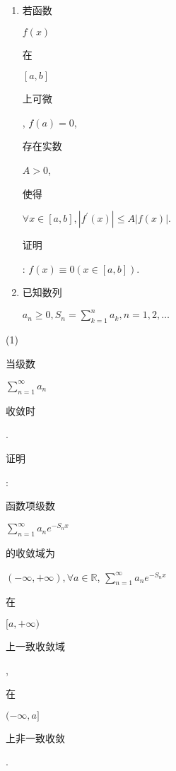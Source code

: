 \documentclass[10pt]{article}
\begin{document}
\begin{enumerate}
  \item \begin{CJK}{UTF8}{mj}若函数\end{CJK} $f(x)$ \begin{CJK}{UTF8}{mj}在\end{CJK} $[a, b]$ \begin{CJK}{UTF8}{mj}上可微\end{CJK}, $f(a)=0$, \begin{CJK}{UTF8}{mj}存在实数\end{CJK} $A>0$, \begin{CJK}{UTF8}{mj}使得\end{CJK} $\forall x \in[a, b],\left|f^{\prime}(x)\right| \leqslant A|f(x)|$. \begin{CJK}{UTF8}{mj}证明\end{CJK}: $f(x) \equiv 0(x \in[a, b])$.

  \item \begin{CJK}{UTF8}{mj}已知数列\end{CJK} $a_{n} \geqslant 0, S_{n}=\sum_{k=1}^{n} a_{k}, n=1,2, \ldots$

\end{enumerate}
(1) \begin{CJK}{UTF8}{mj}当级数\end{CJK} $\sum_{n=1}^{\infty} a_{n}$ \begin{CJK}{UTF8}{mj}收敛时\end{CJK}. \begin{CJK}{UTF8}{mj}证明\end{CJK}: \begin{CJK}{UTF8}{mj}函数项级数\end{CJK} $\sum_{n=1}^{\infty} a_{n} e^{-S_{n} x}$ \begin{CJK}{UTF8}{mj}的收敛域为\end{CJK} $(-\infty,+\infty), \forall a \in \mathbb{R}$, $\sum_{n=1}^{\infty} a_{n} e^{-S_{n} x}$ \begin{CJK}{UTF8}{mj}在\end{CJK} $[a,+\infty)$ \begin{CJK}{UTF8}{mj}上一致收敛域\end{CJK}, \begin{CJK}{UTF8}{mj}在\end{CJK} $(-\infty, a]$ \begin{CJK}{UTF8}{mj}上非一致收敛\end{CJK}.
\end{document}
